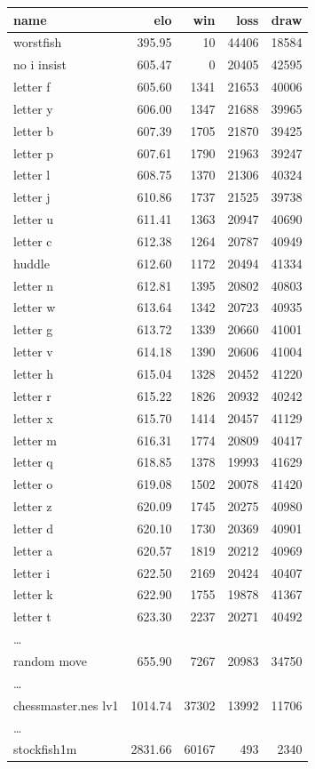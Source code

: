 \documentclass[twocolumn]{article}
\begin{document}
{
  \tiny
\begin{tabular}{lrrrr}
name & elo & win & loss & draw \\
\hline  
worstfish & 395.95 & 10 & 44406 & 18584 \\
no i insist & 605.47 & 0 & 20405 & 42595 \\
letter f & 605.60 & 1341 & 21653 & 40006 \\
letter y & 606.00 & 1347 & 21688 & 39965 \\
letter b & 607.39 & 1705 & 21870 & 39425 \\
letter p & 607.61 & 1790 & 21963 & 39247 \\
letter l & 608.75 & 1370 & 21306 & 40324 \\
letter j & 610.86 & 1737 & 21525 & 39738 \\
letter u & 611.41 & 1363 & 20947 & 40690 \\
letter c & 612.38 & 1264 & 20787 & 40949 \\
huddle & 612.60 & 1172 & 20494 & 41334 \\
letter n & 612.81 & 1395 & 20802 & 40803 \\
letter w & 613.64 & 1342 & 20723 & 40935 \\
letter g & 613.72 & 1339 & 20660 & 41001 \\
letter v & 614.18 & 1390 & 20606 & 41004 \\
letter h & 615.04 & 1328 & 20452 & 41220 \\
letter r & 615.22 & 1826 & 20932 & 40242 \\
letter x & 615.70 & 1414 & 20457 & 41129 \\
letter m & 616.31 & 1774 & 20809 & 40417 \\
letter q & 618.85 & 1378 & 19993 & 41629 \\
letter o & 619.08 & 1502 & 20078 & 41420 \\
letter z & 620.09 & 1745 & 20275 & 40980 \\
letter d & 620.10 & 1730 & 20369 & 40901 \\
letter a & 620.57 & 1819 & 20212 & 40969 \\
letter i & 622.50 & 2169 & 20424 & 40407 \\
letter k & 622.90 & 1755 & 19878 & 41367 \\
letter t & 623.30 & 2237 & 20271 & 40492 \\
\ldots \\
random move & 655.90 & 7267 & 20983 & 34750 \\
\ldots \\
chessmaster.nes lv1 & 1014.74 & 37302 & 13992 & 11706 \\
\ldots \\
stockfish1m & 2831.66 & 60167 & 493 & 2340 \\
\end{tabular}
}
\end{document}
